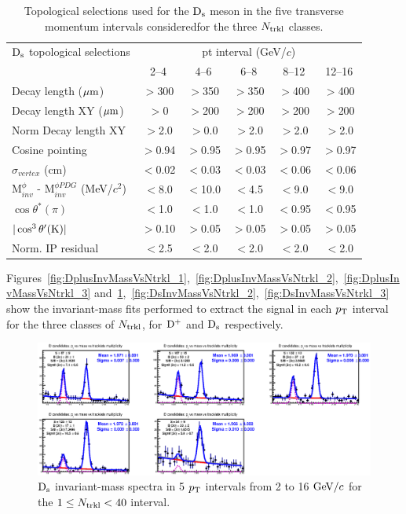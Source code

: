\begin{table}[h!]
\centering
\begin{tabular}{|l|c|c|c|c|c|}
\hline
${\rm D_s}$ topological selections & \multicolumn{5}{c|}{pt interval (GeV/$c$)}\\
\cline{2-6}
  & 2--4  & 4--6 & 6--8 & 8--12 & 12--16\\
\hline
Decay length ($\mathrm{\mu m}$)        & $>$300 & $>$350 & $>$350 & $>$400& $>$400\\
Decay length XY ($\mathrm{\mu m}$)     & $>$0 & $>$200 & $>$200 & $>$200 & $>$200\\
Norm Decay length XY          & $>$2.0& $>$0.0 & $>$2.0 & $>$2.0 & $>$2.0\\
Cosine pointing              & $>$0.94 & $>$0.95 & $>$0.95 & $>$0.97 & $>$0.97\\
$\sigma_{vertex}$  (cm)          & $<$0.02 & $<$0.03 & $<$0.03 & $<$0.06 & $<$0.06\\
M$^{\phi}_{inv}$ - M$^{\phi PDG}_{inv}$ (MeV/$c^{2}$) & $<$8.0 & $<$10.0 & $<$4.5 & $<$9.0 & $<$9.0\\
$\cos \theta^*(\pi)$    & $<$1.0 & $<$1.0 & $<$1.0 & $<$0.95 & $<$0.95\\
$|\cos^3 \theta^\prime({\rm K})|$        & $>$0.10 & $>$0.05 & $>$0.05 & $>$0.05 & $>$0.05\\
Norm. IP residual  & $<$2.5 & $<$2.0 & $<$2.0 & $<$2.0  & $<$2.0 \\
\hline
\end{tabular}
\caption{Topological selections used for the ${\rm D_s}$ meson in the five transverse momentum intervals consideredfor the three $N_{\rm trkl}$ classes.}
\label{tab:cutsDsVsNtrkl}
\end{table}

Figures~\ref{fig:DplusInvMassVsNtrkl_1},~\ref{fig:DplusInvMassVsNtrkl_2},~\ref{fig:DplusInvMassVsNtrkl_3}  and~\ref{fig:DsInvMassVsNtrkl_1},~\ref{fig:DsInvMassVsNtrkl_2},~\ref{fig:DsInvMassVsNtrkl_3} show the invariant-mass fits performed to extract the signal in each $p_{\rm T}$ interval for the three classes of $N_{\rm trkl}$, for ${\rm D^+}$ and ${\rm D_s}$ respectively. 


\begin{figure}[htpb]
\centering
 \includegraphics[width=.9\textwidth]{FigCap6/DsMass140.eps}
  \caption{${\rm D_s}$ invariant-mass spectra in 5 $p_{\rm T}$ intervals from 2 to 16 $\mathrm{GeV}/c$ for the $1 \leq N_{\rm trkl} < 40$ interval.}
 \label{fig:DsInvMassVsNtrkl_1}
\end{figure}

